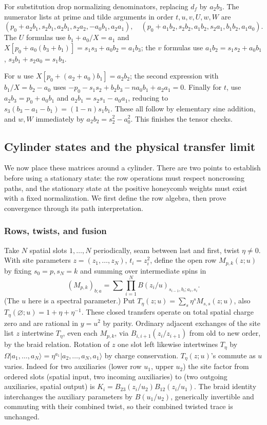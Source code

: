 For substitution drop normalizing denominators, replacing \(d_f\) by \(a_2 b_3\). The numerator lists at prime and tilde arguments in order \(t,u,v,U,w,W\) are
\[
 (p_0+a_2b_1,s_2b_1,a_2b_1,s_2a_2,-a_0b_1,a_2a_1),\quad
 (p_0+a_1b_2,s_2b_2,a_1b_2,s_2a_1,b_1b_2,a_1a_0).
\]
The \(U\) formulas use \(b_1+a_0/X=a_1\) and \(X[p_0+a_0(b_3+b_1)]=s_1s_3+a_0b_2=a_1b_3\); the \(v\) formulas use \(a_1b_2=s_1s_2+a_0 b_1\), \(s_3b_1+s_2 a_0=s_1 b_3\).

For \(u\) use \(X[p_0+(a_2+a_0)b_1]=a_2b_2\); the second expression with \(b_1/X=b_2-a_0\) uses \(-p_0-s_1s_2+b_2b_3-n a_0b_1+a_2a_1=0\). Finally for \(t\), use \(a_2 b_3=p_0+a_0 b_1\) and \(a_2 b_1=s_2s_1-a_0a_1\), reducing to \(s_3(b_3-a_1-b_1)=(1-n)s_1 b_1\). These all follow by elementary sine addition, and \(w,W\) immediately by \(a_2 b_2=s_2^2-a_0^2\). This finishes the tensor checks.

\subsection{Cylinder states and the physical transfer limit}\label{c4:cylinder}

We now place these matrices around a cylinder. There are two points to
establish before using a stationary state: the row operations must respect
noncrossing paths, and the stationary state at the positive honeycomb
weights must exist with a fixed normalization. We first define the row
algebra, then prove convergence through its path interpretation.

\subsubsection{Rows, twists, and fusion}

Take \(N\) spatial slots \(1,\ldots,N\) periodically, seam between last and first, twist \(\eta\ne 0\). With site parameters \(z=(z_1,\ldots,z_N)\), \(t_i=z_i^2\), define the open row \(M_{p,k}(z;u)\) by fixing \(s_0=p,s_N=k\) and summing over intermediate spins in
\[
 (M_{p,k})_{b;a}=\sum \prod_{i=1}^N B(z_i/u)_{s_{i-1},b_i;a_i,s_i}.
\]
(The \(u\) here is a spectral parameter.) Put \(T_\eta(z;u)=\sum_s\eta^s M_{s,s}(z;u)\), also \(T_\eta(\varnothing;u)=1+\eta+\eta^{-1}\). These closed transfers operate on total spatial charge zero and are rational in \(y=u^2\) by parity. Ordinary adjacent exchanges of the site list \(z\) intertwine \(T_\eta\), even each \(M_{p,k}\), via \(B_{i,i+1}(z_i/z_{i+1})\) from old to new order, by the braid relation. Rotation of \(z\) one slot left likewise intertwines \(T_\eta\) by
\(\Omega |a_1,\ldots,a_N\rangle=\eta^{a_1}|a_2,\ldots,a_N,a_1\rangle\)
by charge conservation. \(T_\eta(z;u)\)'s commute as \(u\) varies. Indeed for two auxiliaries (lower row \(u_1\), upper \(u_2\)) the site factor from ordered slots (spatial input, two incoming auxiliaries) to (two outgoing auxiliaries, spatial output) is \(K_i=B_{23}(z_i/u_2)B_{12}(z_i/u_1)\). The braid identity interchanges the auxiliary parameters by \(B(u_1/u_2)\), generically invertible and commuting with their combined twist, so their combined twisted trace is unchanged.

